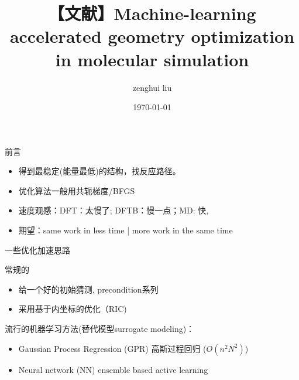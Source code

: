 \documentclass[xcolor=x11names,UTF8]{ctexbeamer}
\title[Short title]{【文献】Machine-learning accelerated geometry optimization in molecular simulation} %
\author{zenghui liu} %
\institute[xtalpi] %
{ xtalpi\\ %

\medskip
\textit{akakcolin@163.com} %
}
\date{\today} %
\begin{document}
\maketitle


\begin{frame}{前言}

  \begin{itemize}
  \item 得到最稳定(能量最低)的结构，找反应路径。
  \item 优化算法一般用共轭梯度/BFGS
  \item 速度观感：DFT：太慢了; DFTB：慢一点；MD: 快,
  \item 期望：same work in less time | more work in the same time
  \end{itemize}
\end{frame}

\begin{frame}{一些优化加速思路}

    常规的
    \begin{itemize}
        \item  给一个好的初始猜测, precondition系列
        \item  采用基于内坐标的优化（RIC)
    \end{itemize}

    流行的机器学习方法(替代模型surrogate modeling)：
    \begin{itemize}
        \item Gaussian Process Regression (GPR)  高斯过程回归 ($O(n^2N^2)$)
        \item Neural network (NN) ensemble based active learning
    \end{itemize}

\end{frame}
\end{document}
